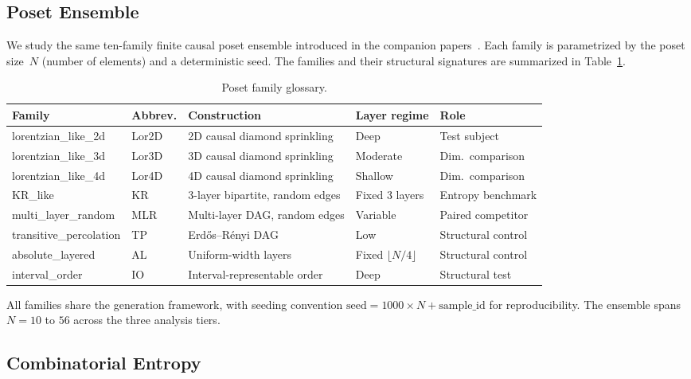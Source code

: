 \documentclass[entropy,article,submit,pdftex,moreauthors]{Definitions/mdpi}
\begin{document}
\subsection{Poset Ensemble}

We study the same ten-family finite causal poset ensemble introduced in the companion papers~\cite{zhang2026predB,zhang2026predA}. Each family is parametrized by the poset size~$N$ (number of elements) and a deterministic seed. The families and their structural signatures are summarized in Table~\ref{tab:families}.

\begin{table}[H]
\caption{Poset family glossary.\label{tab:families}}
\begin{tabular}{lllll}
\toprule
\textbf{Family} & \textbf{Abbrev.} & \textbf{Construction} & \textbf{Layer regime} & \textbf{Role} \\
\midrule
lorentzian\_like\_2d & Lor2D & 2D causal diamond sprinkling & Deep & Test subject \\
lorentzian\_like\_3d & Lor3D & 3D causal diamond sprinkling & Moderate & Dim.\ comparison \\
lorentzian\_like\_4d & Lor4D & 4D causal diamond sprinkling & Shallow & Dim.\ comparison \\
KR\_like & KR & 3-layer bipartite, random edges & Fixed 3 layers & Entropy benchmark \\
multi\_layer\_random & MLR & Multi-layer DAG, random edges & Variable & Paired competitor \\
transitive\_percolation & TP & Erd\H{o}s--R\'enyi DAG & Low & Structural control \\
absolute\_layered & AL & Uniform-width layers & Fixed $\lfloor N/4 \rfloor$ & Structural control \\
interval\_order & IO & Interval-representable order & Deep & Structural test \\
\bottomrule
\end{tabular}
\end{table}

All families share the generation framework, with seeding convention $\text{seed} = 1000 \times N + \text{sample\_id}$ for reproducibility. The ensemble spans $N = 10$ to $56$ across the three analysis tiers.

\subsection{Combinatorial Entropy}
\end{document}
